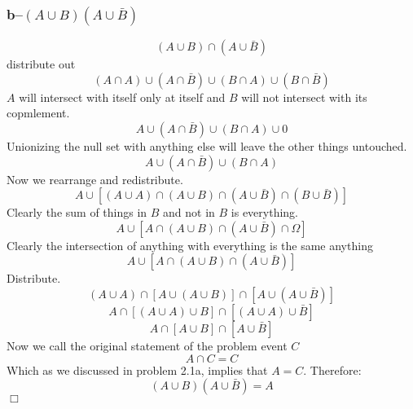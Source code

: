 \subsubsection{b--$(A \cup B)(A \cup \bar{B})$}
\begin{equation}
	(A \cup B)\cap (A \cup \bar{B})
\end{equation}
distribute out
\begin{equation}
	(A \cap A)\cup (A \cap \bar{B})\cup (B \cap A)\cup (B \cap \bar{B})
\end{equation}
$A$ will intersect with itself only at itself and $B$ will not intersect with its copmlement.
\begin{equation}
	A\cup (A \cap \bar{B})\cup (B \cap A)\cup 0
\end{equation}
Unionizing the null set with anything else will leave the other things untouched.
\begin{equation}
	A\cup (A \cap \bar{B})\cup (B \cap A)
\end{equation}
Now we rearrange and redistribute.
\begin{equation}
	A\cup \left[  (A \cup A) \cap (A \cup B) \cap (A \cup \bar{B}) \cap (B \cup \bar{B}) \right]
\end{equation}
Clearly the sum of things in $B$ and not in $B$ is everything.
\begin{equation}
	A\cup \left[  A \cap (A \cup B) \cap (A \cup \bar{B}) \cap \Omega \right]
\end{equation}
Clearly the intersection of anything with everything is the same anything
\begin{equation}
	A\cup \left[  A \cap (A \cup B) \cap (A \cup \bar{B}) \right]
\end{equation}
Distribute.
\begin{equation}
	(A\cup A) \cap \left[  A \cup (A \cup B) \right]\cap \left[  A \cup (A \cup \bar{B}) \right]
\end{equation}
\begin{equation}
	A \cap \left[  (A \cup A) \cup B \right]\cap \left[  (A \cup A) \cup \bar{B} \right]
\end{equation}
\begin{equation}
	A \cap \left[  A \cup B \right]\cap \left[ A \cup \bar{B} \right]
\end{equation}
Now we call the original statement of the problem event $C$
\begin{equation}
	A \cap C = C
\end{equation}
Which as we discussed in problem 2.1a, implies that $A=C$.  Therefore:
\begin{equation}
	(A \cup B)(A \cup \bar{B}) = A
\label{answer2.3b}
\end{equation}
$\Box$

